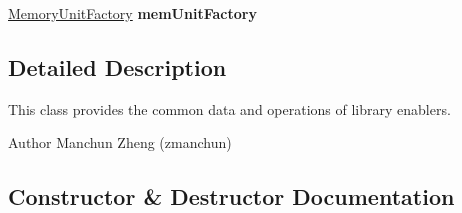 \begin{DoxyCompactItemize}
\item 
\hypertarget{classedu_1_1udel_1_1cis_1_1vsl_1_1civl_1_1library_1_1common_1_1BaseLibraryEnabler_ab112c0763179b6fce4fd403789cb6ffe}{}\hyperlink{interfaceedu_1_1udel_1_1cis_1_1vsl_1_1civl_1_1state_1_1IF_1_1MemoryUnitFactory}{Memory\+Unit\+Factory} {\bfseries mem\+Unit\+Factory}\label{classedu_1_1udel_1_1cis_1_1vsl_1_1civl_1_1library_1_1common_1_1BaseLibraryEnabler_ab112c0763179b6fce4fd403789cb6ffe}

\end{DoxyCompactItemize}


\subsection{Detailed Description}
This class provides the common data and operations of library enablers. 

\begin{DoxyAuthor}{Author}
Manchun Zheng (zmanchun) 
\end{DoxyAuthor}


\subsection{Constructor \& Destructor Documentation}
\hypertarget{classedu_1_1udel_1_1cis_1_1vsl_1_1civl_1_1library_1_1common_1_1BaseLibraryEnabler_a8bfe9b1dfe4697c95c7f7bee5f02465c}{}
